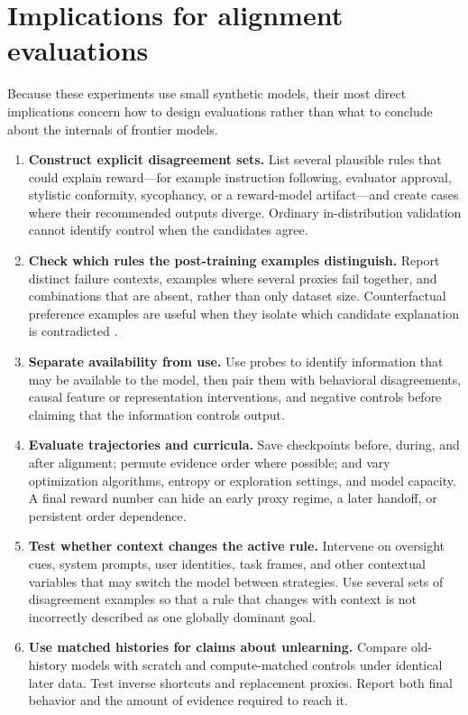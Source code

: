 \documentclass[11pt,a4paper]{article}
\begin{document}
\section*{Implications for alignment evaluations}

Because these experiments use small synthetic models, their most direct implications concern how to design evaluations rather than what to conclude about the internals of frontier models.

\begin{enumerate}[leftmargin=*,itemsep=0.5em]
  \item \textbf{Construct explicit disagreement sets.} List several plausible rules that could explain reward---for example instruction following, evaluator approval, stylistic conformity, sycophancy, or a reward-model artifact---and create cases where their recommended outputs diverge. Ordinary in-distribution validation cannot identify control when the candidates agree.
  \item \textbf{Check which rules the post-training examples distinguish.} Report distinct failure contexts, examples where several proxies fail together, and combinations that are absent, rather than only dataset size. Counterfactual preference examples are useful when they isolate which candidate explanation is contradicted \citep{kaushik2020difference}.
  \item \textbf{Separate availability from use.} Use probes to identify information that may be available to the model, then pair them with behavioral disagreements, causal feature or representation interventions, and negative controls before claiming that the information controls output.
  \item \textbf{Evaluate trajectories and curricula.} Save checkpoints before, during, and after alignment; permute evidence order where possible; and vary optimization algorithms, entropy or exploration settings, and model capacity. A final reward number can hide an early proxy regime, a later handoff, or persistent order dependence.
  \item \textbf{Test whether context changes the active rule.} Intervene on oversight cues, system prompts, user identities, task frames, and other contextual variables that may switch the model between strategies. Use several sets of disagreement examples so that a rule that changes with context is not incorrectly described as one globally dominant goal.
  \item \textbf{Use matched histories for claims about unlearning.} Compare old-history models with scratch and compute-matched controls under identical later data. Test inverse shortcuts and replacement proxies. Report both final behavior and the amount of evidence required to reach it.
\end{enumerate}
\end{document}
